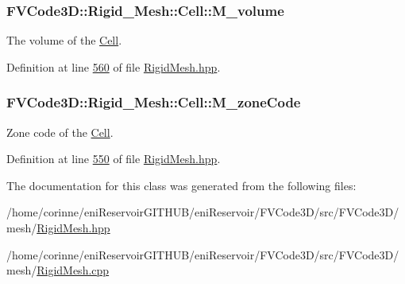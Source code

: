 \subsubsection[{\texorpdfstring{M\+\_\+volume}{M_volume}}]{ F\+V\+Code3\+D\+::\+Rigid\+\_\+\+Mesh\+::\+Cell\+::\+M\+\_\+volume\hspace{0.3cm}{\ttfamily [protected]}}\hypertarget{classFVCode3D_1_1Rigid__Mesh_1_1Cell_aeda1d5ff8f04d9e93919f454e3f44021}{}\label{classFVCode3D_1_1Rigid__Mesh_1_1Cell_aeda1d5ff8f04d9e93919f454e3f44021}


The volume of the \hyperlink{classFVCode3D_1_1Rigid__Mesh_1_1Cell}{Cell}. 



Definition at line \hyperlink{RigidMesh_8hpp_source_l00560}{560} of file \hyperlink{RigidMesh_8hpp_source}{Rigid\+Mesh.\+hpp}.

\subsubsection[{\texorpdfstring{M\+\_\+zone\+Code}{M_zoneCode}}]{ F\+V\+Code3\+D\+::\+Rigid\+\_\+\+Mesh\+::\+Cell\+::\+M\+\_\+zone\+Code\hspace{0.3cm}{\ttfamily [protected]}}\hypertarget{classFVCode3D_1_1Rigid__Mesh_1_1Cell_aa0db94ef04ad17d564ba7fe53f7979ab}{}\label{classFVCode3D_1_1Rigid__Mesh_1_1Cell_aa0db94ef04ad17d564ba7fe53f7979ab}


Zone code of the \hyperlink{classFVCode3D_1_1Rigid__Mesh_1_1Cell}{Cell}. 



Definition at line \hyperlink{RigidMesh_8hpp_source_l00550}{550} of file \hyperlink{RigidMesh_8hpp_source}{Rigid\+Mesh.\+hpp}.



The documentation for this class was generated from the following files\+:\begin{DoxyCompactItemize}
\item 
/home/corinne/eni\+Reservoir\+G\+I\+T\+H\+U\+B/eni\+Reservoir/\+F\+V\+Code3\+D/src/\+F\+V\+Code3\+D/mesh/\hyperlink{RigidMesh_8hpp}{Rigid\+Mesh.\+hpp}\item 
/home/corinne/eni\+Reservoir\+G\+I\+T\+H\+U\+B/eni\+Reservoir/\+F\+V\+Code3\+D/src/\+F\+V\+Code3\+D/mesh/\hyperlink{RigidMesh_8cpp}{Rigid\+Mesh.\+cpp}\end{DoxyCompactItemize}
